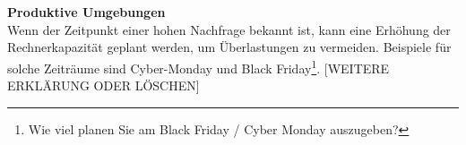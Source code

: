 \\\\
\textbf{Produktive Umgebungen}\\
Wenn der Zeitpunkt einer hohen Nachfrage bekannt ist, kann eine Erhöhung der Rechnerkapazität geplant werden, um Überlastungen zu vermeiden. Beispiele für solche Zeiträume sind Cyber-Monday und Black Friday\footnote{\cite{STA5}Wie viel planen Sie am Black Friday / Cyber Monday auszugeben?}. 
[WEITERE ERKLÄRUNG ODER LÖSCHEN]

